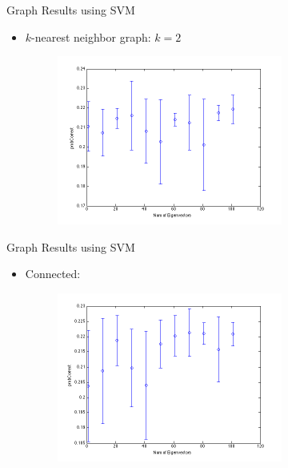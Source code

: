 \documentclass[xcolor=dvipsnames,t]{beamer} %
\begin{document}
\begin{frame}{Graph Results using SVM}
\begin{itemize}
\item $k$-nearest neighbor graph: $k=2$ 
\begin{figure}[h!]
  \centering
    \includegraphics[width=0.7\textwidth]{figures/plotopt2k2n1.png}
\end{figure}
\end{itemize}
\end{frame}
\begin{frame}{Graph Results using SVM}
\begin{itemize}
\item Connected:  
\begin{figure}[h!]
  \centering
    \includegraphics[width=0.7\textwidth]{figures/plotopt3n1.png}
\end{figure}
\end{itemize}
\end{frame}
\end{document}
